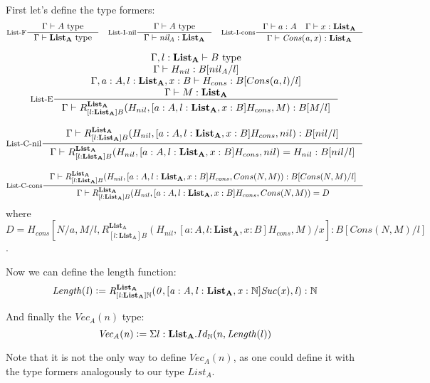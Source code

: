 \begin{answer}
  First let's define the type formers:
  \[
    \inference[List-F]{\Gamma \vdash A ~\text{type}}{\Gamma \vdash \mathbf{List_A} ~\text{type}}\quad
    \inference[List-I-nil]{\Gamma \vdash A ~\text{type}}{\Gamma \vdash \mathit{nil_A} : \mathbf{List_A}}\quad
    \inference[List-I-cons]{\Gamma \vdash a : A \quad \Gamma \vdash x : \mathbf{List_A}}{\Gamma \vdash \mathit{Cons(a, x)} : \mathbf{List_A}}
  \]

  \[
    \inference[List-E]{
      \Gamma, l: \mathbf{List_A} \vdash B ~\text{type}\\
      \Gamma \vdash H_{nil} : B[nil_A/l]\\
      \Gamma, a : A, l : \mathbf{List_A}, x: B \vdash H_{cons} : B[Cons(a, l)/l]\\
      \Gamma \vdash M : \mathbf{List_A}
    }{\Gamma \vdash R^{\mathbf{List_A}}_{[l: \mathbf{List_A}]B}(H_{nil}, [a : A, l: \mathbf{List_A}, x : B] H_{cons}, M) : B[M/l]}
  \]

  \[
    \inference[List-C-nil]{
      \Gamma \vdash R^{\mathbf{List_A}}_{[l: \mathbf{List_A}]B}(H_{nil}, [a : A, l: \mathbf{List_A}, x: B] H_{cons}, nil) : B[nil/l]
    }{\Gamma \vdash R^{\mathbf{List_A}}_{[l: \mathbf{List_A}]B}(H_{nil}, [a : A, l: \mathbf{List_A}, x: B]H_{cons}, nil) = H_{nil} : B[nil/l]}
  \]

  \[
    \inference[List-C-cons]{
      \Gamma \vdash R^{\mathbf{List_A}}_{[l: \mathbf{List_A}]B}(H_{nil}, [a : A, l: \mathbf{List_A}, x: B] H_{cons}, Cons(N, M)) : B[Cons(N, M)/l]
    }{\Gamma \vdash R^{\mathbf{List_A}}_{[l: \mathbf{List_A}]B}(H_{nil}, [a : A, l: \mathbf{List_A}, x: B] H_{cons}, Cons(N, M)) = D}
  \]
  where $D = H_{cons}[N/a, M/l, R^{\mathbf{List_A}}_{[l: \mathbf{List_A}]B}(H_{nil}, [a : A, l: \mathbf{List_A}, x : B] H_{cons}, M)/x] : B[Cons(N, M)/l]$.

  Now we can define the length function:
  \[
    \mathit{Length(l) \vcentcolon= R^{\mathbf{List_A}}_{[l: \mathbf{List_A}]\mathbb{N}}(0, [a : A, l: \mathbf{List_A}, x : \mathbb{N}] Suc(x), l) : \mathbb{N}}
  \]

  And finally the $\mathit{Vec_A(n)}$ type:
  \[
    \mathit{Vec_A(n)} \vcentcolon= \Sigma l: \mathbf{List_A}. Id_\mathbb{N}(n, \mathit{Length}(l))
  \]

  Note that it is not the only way to define $\mathit{Vec_A(n)}$, as one could
  define it with the type formers analogously to our type $\mathit{List_A}$.
\end{answer}


